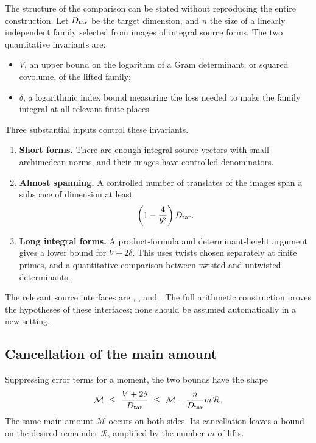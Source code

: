 The structure of the comparison can be stated without reproducing the entire construction. Let \(D_{\rm tar}\) be the target dimension, and \(n\) the size of a linearly independent family selected from images of integral source forms. The two quantitative invariants are:

\begin{itemize}
\item \(V\), an upper bound on the logarithm of a Gram determinant, or squared covolume, of the lifted family;
\item \(\delta\), a logarithmic index bound measuring the loss needed to make the family integral at all relevant finite places.
\end{itemize}

Three substantial inputs control these invariants.

\begin{enumerate}
\item \textbf{Short forms.} There are enough integral source vectors with small archimedean norms, and their images have controlled denominators.
\item \textbf{Almost spanning.} A controlled number of translates of the images span a subspace of dimension at least
\[
\left(1-\frac4{b^2}\right)D_{\rm tar}.
\]
\item \textbf{Long integral forms.} A product-formula and determinant-height argument gives a lower bound for \(V+2\delta\). This uses twists chosen separately at finite primes, and a quantitative comparison between twisted and untwisted determinants.
\end{enumerate}

The relevant source interfaces are ,
, and
. The full arithmetic construction proves the hypotheses of these interfaces; none should be assumed automatically in a new setting.

\subsection{Cancellation of the main amount}

Suppressing error terms for a moment, the two bounds have the shape
\begin{equation}\label{eq:schematic}
\mathcal M\ \le\ \frac{V+2\delta}{D_{\rm tar}}\
\le\ \mathcal M-\frac{n}{D_{\rm tar}}m\,\mathcal R.
\end{equation}
The same main amount \(\mathcal M\) occurs on both sides. Its cancellation leaves a bound on the desired remainder \(\mathcal R\), amplified by the number \(m\) of lifts.

